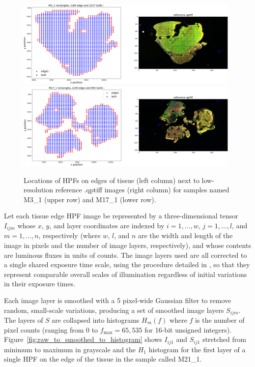 \documentclass[letterpaper,11pt]{article}
\newcommand{\reffig}[1]{Figure~\ref{#1}}
\newcommand{\fmax}{f_{\mathrm{max}}}
\begin{document}
\begin{figure}[!ht]
\centering
\includegraphics[width=0.98\textwidth]{images/masking/rectangle_locations_M3_1}
\includegraphics[width=0.98\textwidth]{images/masking/rectangle_locations_M17_1}
\caption{\footnotesize Locations of HPFs on edges of tissue (left column) next to low-resolution reference .qptiff images (right column) for samples named M3\_1 (upper row) and M17\_1 (lower row). }
\label{fig:edge_HPFs}
\end{figure}

Let each tissue edge HPF image be represented by a three-dimensional tensor $I_{ijm}$ whose $x$, $y$, and layer coordinates are indexed by $i=1,\ldots,w$, $j=1,\ldots,l$, and $m=1,\ldots,n$, respectively (where $w$, $l$, and $n$ are the width and length of the image in pixels and the number of image layers, respectively), and whose contents are luminous fluxes in units of counts. The image layers used are all corrected to a single shared exposure time scale, using the procedure detailed in \cite{exposure_time_correction_note}, so that they represent comparable overall scales of illumination regardless of initial variations in their exposure times.

Each image layer is smoothed with a 5 pixel-wide Gaussian filter to remove random, small-scale variations, producing a set of smoothed image layers $S_{ijm}$. The layers of $S$ are collapsed into histograms $H_{m}(f)$ where $f$ is the number of pixel counts (ranging from 0 to $\fmax=65,535$ for 16-bit unsigned integers). \reffig{fig:raw_to_smoothed_to_histogram} shows $I_{ij1}$ and $S_{ij1}$ stretched from minimum to maximum in grayscale and the $H_{1}$ histogram for the first layer of a single HPF on the edge of the tissue in the sample called M21\_1. 
\end{document}
